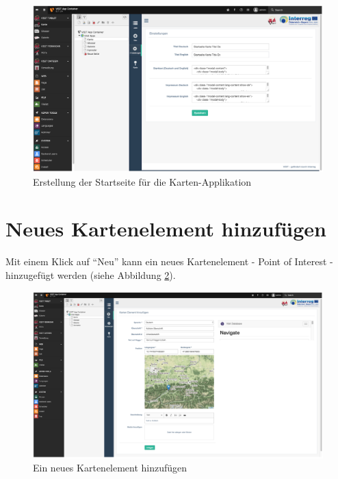 \begin{figure}[ht!]
\centering
\includegraphics[width=12cm]{Figures/paula/befuellte_startseite_karte.png}
\caption{Erstellung der Startseite für die Karten-Applikation}
\label{img:befuellte_startseite_karte}
\end{figure}

\section{Neues Kartenelement hinzufügen}

Mit einem Klick auf “Neu” kann ein neues Kartenelement - Point of Interest - hinzugefügt werden (siehe Abbildung \ref{img:neues_kartenelement_hinzufuegen}).

\begin{figure}[ht!]
\centering
\includegraphics[width=12cm]{Figures/paula/neues_kartenelement_hinzufuegen.png}
\caption{Ein neues Kartenelement hinzufügen}
\label{img:neues_kartenelement_hinzufuegen}
\end{figure}

